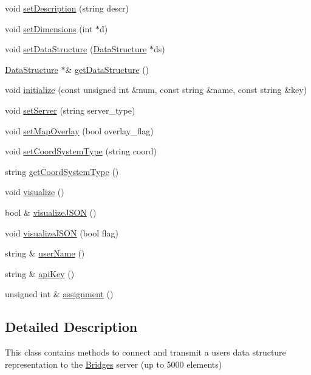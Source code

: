 \begin{DoxyCompactItemize}
void \hyperlink{namespacebridges_1_1_bridges_ada1bced1a3d7af3b8b139bbdfba72fc8}{set\+Description} (string descr)
\item 
void \hyperlink{namespacebridges_1_1_bridges_a1eef7c2daeb3784169965f727bf4ad1b}{set\+Dimensions} (int $\ast$d)
\item 
void \hyperlink{namespacebridges_1_1_bridges_a7447e2d5808c492d26132690c1a639a7}{set\+Data\+Structure} (\hyperlink{classbridges_1_1_data_structure}{Data\+Structure} $\ast$ds)
\item 
\hyperlink{classbridges_1_1_data_structure}{Data\+Structure} $\ast$\& \hyperlink{namespacebridges_1_1_bridges_a7cee9c57a0cd6a213722ba0a81a742f0}{get\+Data\+Structure} ()
\item 
void \hyperlink{namespacebridges_1_1_bridges_a10272250ed6f4bb8281dcaecc61fa698}{initialize} (const unsigned int \&num, const string \&name, const string \&key)
\item 
void \hyperlink{namespacebridges_1_1_bridges_a569953bfdb1c2a29dbd0f7d6dee73606}{set\+Server} (string server\+\_\+type)
\item 
void \hyperlink{namespacebridges_1_1_bridges_a221442c674b625a403486076cf8a7c03}{set\+Map\+Overlay} (bool overlay\+\_\+flag)
\item 
void \hyperlink{namespacebridges_1_1_bridges_ad00c07d3a028110424909081a94c4013}{set\+Coord\+System\+Type} (string coord)
\item 
string \hyperlink{namespacebridges_1_1_bridges_a31f5db39ab9ce7df3e635eaaad1feb12}{get\+Coord\+System\+Type} ()
\item 
void \hyperlink{namespacebridges_1_1_bridges_a2806e395134614cdd6327400b53d28ad}{visualize} ()
\item 
bool \& \hyperlink{namespacebridges_1_1_bridges_a692124feb006d58c277db36c2e9342c8}{visualize\+J\+S\+O\+N} ()
\item 
void \hyperlink{namespacebridges_1_1_bridges_abb0f749a6dbcd0a430504f66de1dbe64}{visualize\+J\+S\+O\+N} (bool flag)
\item 
string \& \hyperlink{namespacebridges_1_1_bridges_a98c0c6658b8eb9e8f20a7f3119cbd984}{user\+Name} ()
\item 
string \& \hyperlink{namespacebridges_1_1_bridges_a4ec319d8c731624bd1aa0efa2427044e}{api\+Key} ()
\item 
unsigned int \& \hyperlink{namespacebridges_1_1_bridges_a97d6cfdc40ecead5d802ac2054933038}{assignment} ()
\end{DoxyCompactItemize}


\subsection{Detailed Description}
This class contains methods to connect and transmit a user\textquotesingle{}s data structure representation to the \hyperlink{namespacebridges_1_1_bridges}{Bridges} server (up to 5000 elements) 

